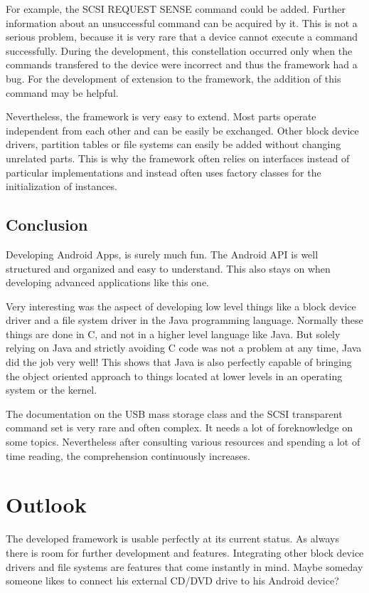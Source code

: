 For example, the SCSI REQUEST SENSE command could be added. Further information about an unsuccessful command can be acquired by it. This is not a serious problem, because it is very rare that a device cannot execute a command successfully. During the development, this constellation occurred only when the commands transfered to the device were incorrect and thus the framework had a bug. For the development of extension to the framework, the addition of this command may be helpful.

Nevertheless, the framework is very easy to extend. Most parts operate independent from each other and can be easily be exchanged. Other block device drivers, partition tables or file systems can easily be added without changing unrelated parts. This is why the framework often relies on interfaces instead of particular implementations and instead often uses factory classes for the initialization of instances.

\section{Conclusion}

Developing Android Apps, is surely much fun. The Android API is well structured and organized and easy to understand. This also stays on when developing advanced applications like this one. 

Very interesting was the aspect of developing low level things like a block device driver and a file system driver in the Java programming language. Normally these things are done in C, and not in a higher level language like Java. But solely relying on Java and strictly avoiding C code was not a problem at any time, Java did the job very well! This shows that Java is also perfectly capable of bringing the object oriented approach to things located at lower levels in an operating system or the kernel.

The documentation on the USB mass storage class and the SCSI transparent command set is very rare and often complex. It needs a lot of foreknowledge on some topics. Nevertheless after consulting various resources and spending a lot of time reading, the comprehension continuously increases.

\chapter{Outlook}

The developed framework is usable perfectly at its current status. As always there is room for further development and features. Integrating other block device drivers and file systems are features that come instantly in mind. Maybe someday someone likes to connect his external CD/DVD drive to his Android device?

